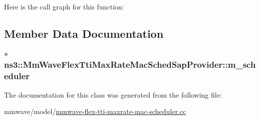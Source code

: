 Here is the call graph for this function\+:




\subsection{Member Data Documentation}
\subsubsection[{\texorpdfstring{m\+\_\+scheduler}{m_scheduler}}]{$\ast$ ns3\+::\+Mm\+Wave\+Flex\+Tti\+Max\+Rate\+Mac\+Sched\+Sap\+Provider\+::m\+\_\+scheduler\hspace{0.3cm}{\ttfamily [private]}}\hypertarget{classns3_1_1MmWaveFlexTtiMaxRateMacSchedSapProvider_ad5f28cd6c6eb3a2cd76831a519b5974e}{}\label{classns3_1_1MmWaveFlexTtiMaxRateMacSchedSapProvider_ad5f28cd6c6eb3a2cd76831a519b5974e}


The documentation for this class was generated from the following file\+:\begin{DoxyCompactItemize}
\item 
mmwave/model/\hyperlink{mmwave-flex-tti-maxrate-mac-scheduler_8cc}{mmwave-\/flex-\/tti-\/maxrate-\/mac-\/scheduler.\+cc}\end{DoxyCompactItemize}
